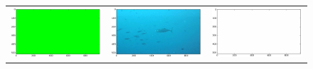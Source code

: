 \begin{figure}[h!tb]
\begin{minipage}{1.3\textwidth}
\begin{tabular}{ccc}
\includegraphics[keepaspectratio=true,width=\segwidth]{images/segment/5053_10__animals__.png} &
\includegraphics[keepaspectratio=true,width=\segwidth]{images/segment/5053_10__image__.png} &
\includegraphics[keepaspectratio=true,width=\segwidth]{images/segment/5053_10__plastic__.png} \\


\end{tabular}
\end{minipage}
\end{figure}
